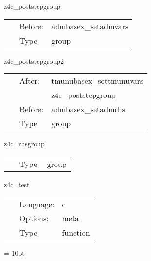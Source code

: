 
\hspace{5mm} z4c\_poststepgroup 

\hspace{5mm}{\it post-process z4c variables } 


\hspace{5mm}

 \begin{tabular*}{160mm}{cll} 
~ & Before:  & admbasex\_setadmvars \\ 
~ & Type:  & group \\ 
\end{tabular*} 


\vspace{5mm}


\hspace{5mm} z4c\_poststepgroup2 

\hspace{5mm}{\it post-process z4c variables, part 2 } 


\hspace{5mm}

 \begin{tabular*}{160mm}{cll} 
~ & After:  & tmunubasex\_settmunuvars \\ 
~& ~ &z4c\_poststepgroup\\ 
~ & Before:  & admbasex\_setadmrhs \\ 
~ & Type:  & group \\ 
\end{tabular*} 


\vspace{5mm}


\hspace{5mm} z4c\_rhsgroup 

\hspace{5mm}{\it calculate z4c rhs } 


\hspace{5mm}

 \begin{tabular*}{160mm}{cll} 
~ & Type:  & group \\ 
\end{tabular*} 


\vspace{5mm}


\hspace{5mm} z4c\_test 

\hspace{5mm}{\it self-test } 


\hspace{5mm}

 \begin{tabular*}{160mm}{cll} 
~ & Language:  & c \\ 
~ & Options:  & meta \\ 
~ & Type:  & function \\ 
\end{tabular*} 



\vspace{5mm}\parskip = 10pt 
